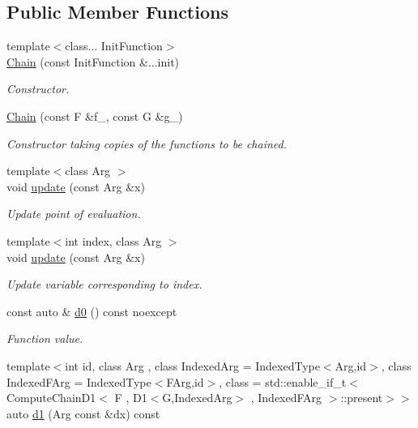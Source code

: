 \subsection*{Public Member Functions}
\begin{DoxyCompactItemize}
\item 
{\footnotesize template$<$class... Init\+Function$>$ }\\\hyperlink{structFunG_1_1MathematicalOperations_1_1Chain_a11bbc19be4ace14904de0be6d703fb1f}{Chain} (const Init\+Function \&...init)
\begin{DoxyCompactList}\small\item\em Constructor. \end{DoxyCompactList}\item 
\hyperlink{structFunG_1_1MathematicalOperations_1_1Chain_a3167b6304026eb0bd92e57d0dd0087e0}{Chain} (const F \&f\+\_\+, const G \&g\+\_\+)
\begin{DoxyCompactList}\small\item\em Constructor taking copies of the functions to be chained. \end{DoxyCompactList}\item 
{\footnotesize template$<$class Arg $>$ }\\void \hyperlink{structFunG_1_1MathematicalOperations_1_1Chain_adb7f63859ef7dbdd08b0908c3a17794d}{update} (const Arg \&x)
\begin{DoxyCompactList}\small\item\em Update point of evaluation. \end{DoxyCompactList}\item 
{\footnotesize template$<$int index, class Arg $>$ }\\void \hyperlink{structFunG_1_1MathematicalOperations_1_1Chain_aa41d754e68072e0a9f1460da79f9913e}{update} (const Arg \&x)
\begin{DoxyCompactList}\small\item\em Update variable corresponding to index. \end{DoxyCompactList}\item 
const auto \& \hyperlink{structFunG_1_1MathematicalOperations_1_1Chain_abaced47a1bdc62dd6625caed1d11134c}{d0} () const noexcept
\begin{DoxyCompactList}\small\item\em Function value. \end{DoxyCompactList}\item 
{\footnotesize template$<$int id, class Arg , class Indexed\+Arg  = Indexed\+Type$<$\+Arg,id$>$, class Indexed\+F\+Arg  = Indexed\+Type$<$\+F\+Arg,id$>$, class  = std\+::enable\+\_\+if\+\_\+t$<$ Compute\+Chain\+D1$<$ F , D1$<$\+G,\+Indexed\+Arg$>$ , Indexed\+F\+Arg $>$\+::present$>$$>$ }\\auto \hyperlink{structFunG_1_1MathematicalOperations_1_1Chain_adfe741dee89257258b39df846fd16cf7}{d1} (Arg const \&dx) const 

\end{DoxyCompactItemize}
